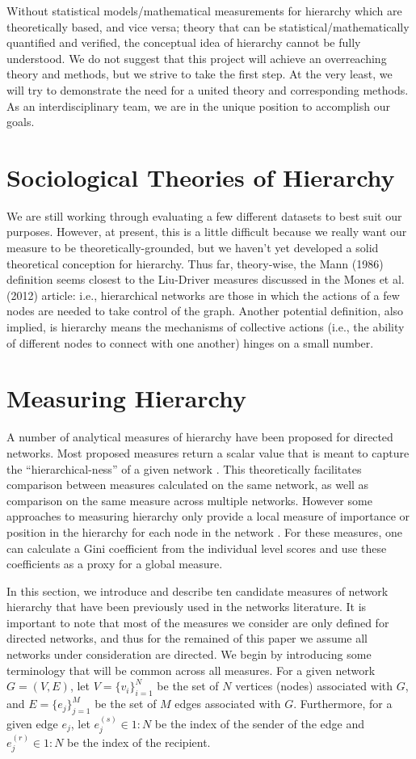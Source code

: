\documentclass[3p,times]{elsarticle}
\begin{document}
Without statistical models/mathematical measurements for hierarchy which are theoretically based, and vice versa; theory that can be statistical/mathematically quantified and verified, the conceptual idea of hierarchy cannot be fully understood. We do not suggest that this project will achieve an overreaching theory and methods, but we strive to take the first step. At the very least, we will try to demonstrate the need for a united theory and corresponding methods. As an interdisciplinary team, we are in the unique position to accomplish our goals.

\section{Sociological Theories of Hierarchy}
	We are still working through evaluating a few different datasets to best suit our purposes. However, at present, this is a little difficult because we really want our measure to be theoretically-grounded, but we haven't yet developed a solid theoretical conception for hierarchy. Thus far, theory-wise, the Mann (1986) definition seems closest to the Liu-Driver measures discussed in the Mones et al. (2012) article: i.e., hierarchical networks are those in which the actions of a few nodes are needed to take control of the graph. Another potential definition, also implied, is hierarchy means the mechanisms of collective actions (i.e., the ability of different nodes to connect with one another) hinges on a small number.

\section{Measuring Hierarchy}
A number of analytical measures of hierarchy have been proposed for directed networks. Most proposed measures return a scalar value that is meant to capture the ``hierarchical-ness'' of a given network \cite{eigen, between,kendall, landau, GRC}. This theoretically facilitates comparison between measures calculated on the same network, as well as comparison on the same measure across multiple networks. However some approaches to measuring hierarchy only provide a local measure of importance or position in the hierarchy for each node in the network \cite{key}. For these measures, one can calculate a Gini coefficient \cite{Yitzhaki1979} from the individual level scores and use these coefficients as a proxy for a global measure. 

In this section, we introduce and describe ten candidate measures of network hierarchy that have been previously used in the networks literature. It is important to note that most of the measures we consider are only defined for directed networks, and thus for the remained of this paper we assume all networks under consideration are directed. We begin by introducing some terminology that will be common across all measures. For a given network $G=(V,E)$, let $V=\{v_i\}_{i=1}^N$ be the set of $N$ vertices (nodes) associated with $G$, and $E=\{e_j\}_{j=1}^M$ be the set of $M$ edges associated with $G$. Furthermore, for a given edge $e_j$, let $e_j^{(s)} \in 1:N$ be the index of the sender of the edge and $e_j^{(r)} \in 1:N$ be the index of the recipient. 
\end{document}
